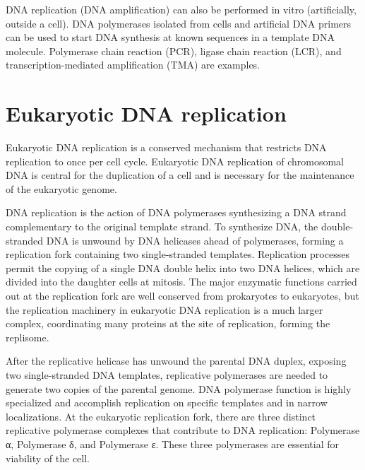 DNA replication (DNA amplification) can also be performed in vitro (artificially, outside a cell). DNA polymerases isolated from cells and artificial DNA primers can be used to start DNA synthesis at known sequences in a template DNA molecule. Polymerase chain reaction (PCR), ligase chain reaction (LCR), and transcription-mediated amplification (TMA) are examples.

\hypertarget{eukaryotic-dna-replication}{%
\section{Eukaryotic DNA replication}\label{eukaryotic-dna-replication}}

Eukaryotic DNA replication is a conserved mechanism that restricts DNA replication to once per cell cycle. Eukaryotic DNA replication of chromosomal DNA is central for the duplication of a cell and is necessary for the maintenance of the eukaryotic genome.

DNA replication is the action of DNA polymerases synthesizing a DNA strand complementary to the original template strand. To synthesize DNA, the double-stranded DNA is unwound by DNA helicases ahead of polymerases, forming a replication fork containing two single-stranded templates. Replication processes permit the copying of a single DNA double helix into two DNA helices, which are divided into the daughter cells at mitosis. The major enzymatic functions carried out at the replication fork are well conserved from prokaryotes to eukaryotes, but the replication machinery in eukaryotic DNA replication is a much larger complex, coordinating many proteins at the site of replication, forming the replisome.

After the replicative helicase has unwound the parental DNA duplex, exposing two single-stranded DNA templates, replicative polymerases are needed to generate two copies of the parental genome. DNA polymerase function is highly specialized and accomplish replication on specific templates and in narrow localizations. At the eukaryotic replication fork, there are three distinct replicative polymerase complexes that contribute to DNA replication: Polymerase α, Polymerase δ, and Polymerase ε. These three polymerases are essential for viability of the cell.



